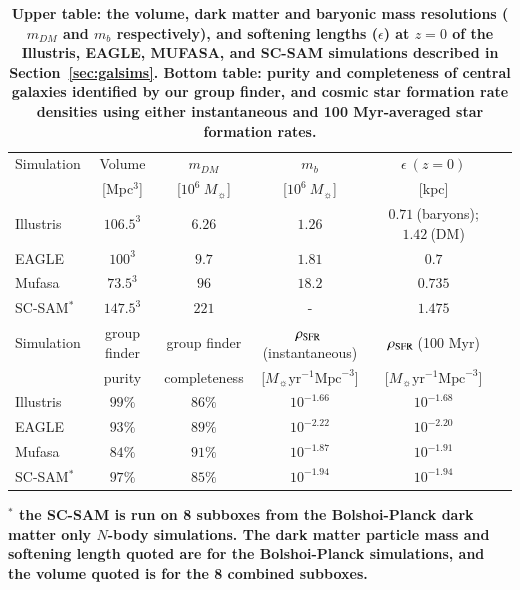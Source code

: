 \documentclass[tighten, preprint]{aastex62}
\begin{document}
\begin{table}
\caption{\bf \color{red} Upper table: the volume, dark matter and baryonic mass resolutions 
($m_{DM}$ and $m_b$ respectively), and softening lengths ($\epsilon$) at $z=0$ of the 
Illustris, EAGLE, MUFASA, and SC-SAM simulations described in Section~\ref{sec:galsims}. 
Bottom table: purity and completeness of central galaxies identified by our group finder, 
and cosmic star formation rate densities using either instantaneous and 100 Myr-averaged 
star formation rates.} 
\begin{center}
\begin{tabular}{p{3cm}ccccc} \toprule
Simulation & Volume & $m_{DM}$ & $m_b$ &  $\epsilon\ (z=0)$\\ 
            & [Mpc$^3$] & [$10^6\ M_{\sun}$] & [$10^6\ M_{\sun}$] & [kpc] \\
\hline
Illustris 	& $106.5^3$	& $6.26$ & $1.26$   & $0.71\ $(baryons); $1.42\ $(DM)\\
EAGLE  		& $100^3$	& $9.7$ & $1.81$    &  $0.7$ \\
{\sc Mufasa} & $73.5^3$	& $96$ & $18.2$    &  $0.735$ \\
SC-SAM$^*$ & $147.5^3$	& $221$ & -      &   $1.475$ \\ 
\hline
\hline
Simulation & group finder & group finder & $\rho_{\rm SFR}\ $(instantaneous) & $\rho_{\rm SFR}\ $(100 Myr) & \\
            &purity & completeness & [$M_{\sun} \textrm{yr}^{-1} \textrm{Mpc}^{-3}$] & [$M_{\sun} \textrm{yr}^{-1} \textrm{Mpc}^{-3}$] & \\
            \hline
Illustris 	&  $99\%$ & $86\%$ & $10^{-1.66}$ & $10^{-1.68}$ \\
EAGLE  		&  $93\%$ & $89\%$ & $10^{-2.22}$ & $10^{-2.20}$ \\
{\sc Mufasa} &  $84\%$ & $91\%$ & $10^{-1.87}$ & $10^{-1.91}$ \\
SC-SAM$^*$ &  $97\%$ & $85\%$ & $10^{-1.94}$ & $10^{-1.94}$ \\ 
\hline
\end{tabular} \label{tab:sims}
\end{center}
{\bf \color{red}
$^*$ the SC-SAM is run on 8 subboxes from the Bolshoi-Planck dark matter only $N$-body simulations. The dark matter particle mass and softening length quoted are for the Bolshoi-Planck simulations, and the volume quoted is for the 8 combined subboxes.}
\end{table}
\end{document}
